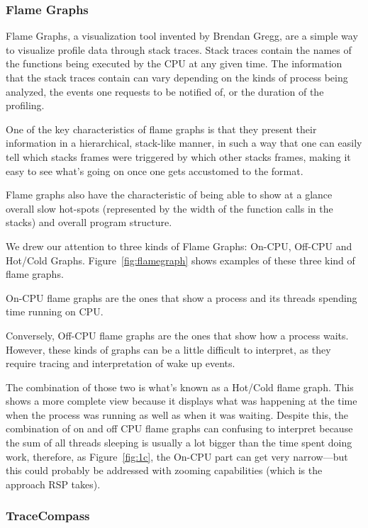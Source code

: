 \documentclass[10pt]{article}
\begin{document}
\subsubsection{Flame Graphs}

Flame Graphs, a visualization tool invented by Brendan
Gregg\cite{brendanGregg}, are a simple way to visualize profile data through
stack traces. Stack traces contain the names of the functions being executed by
the CPU at any given time. The information that the stack traces contain can
vary depending on the kinds of process being analyzed, the events one requests
to be notified of, or the duration of the profiling.

One of the key characteristics of flame graphs is that they present their
information in a hierarchical, stack-like manner, in such a way that one can
easily tell which stacks frames were triggered by which other stacks frames,
making it easy to see what's going on once one gets accustomed to the format.

Flame graphs also have the characteristic of being able to show at a glance
overall slow hot-spots (represented by the width of the function calls in the
stacks) and overall program structure.

We drew our attention to three kinds of Flame Graphs: On-CPU\cite{oncpu},
Off-CPU\cite{offcpu} and Hot/Cold Graphs\cite{hotcold}.
Figure~\ref{fig:flamegraph} shows examples of these three kind of flame graphs.

On-CPU flame graphs are the ones that show a process and its threads spending
time running on CPU.

Conversely, Off-CPU flame graphs are the ones that show how a process waits.
However, these kinds of graphs can be a little difficult to interpret, as they
require tracing and interpretation of wake up events.

The combination of those two is what's known as a Hot/Cold flame graph. This
shows a more complete view because it displays what was happening at the time
when the process was running as well as when it was waiting. Despite this, the
combination of on and off CPU flame graphs can confusing to interpret because
the sum of all threads sleeping is usually a lot bigger than the time spent
doing work, therefore, as Figure~\ref{fig:1c}, the On-CPU part can get very
narrow---but this could probably be addressed with zooming capabilities (which
is the approach RSP takes).

\subsubsection{TraceCompass}
\end{document}
